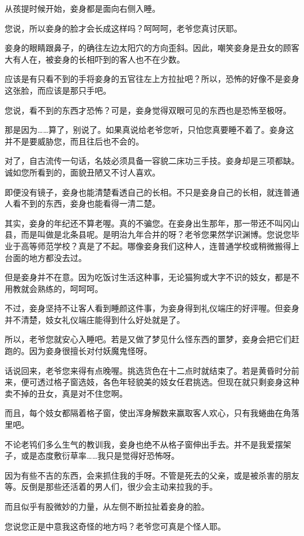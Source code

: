 \documentclass[portrait,a4paper]{article}
\begin{document}
从孩提时候开始，妾身都是面向右侧入睡。

您说，所以妾身的脸才会长成这样吗？呵呵呵，老爷您真讨厌耶。

妾身的眼睛跟鼻子，的确往左边太阳穴的方向歪斜。因此，嘲笑妾身是丑女的顾客大有人在，被妾身的长相吓到的客人也不在少数。

应该是有只看不到的手将妾身的五官往左上方拉扯吧？所以，恐怖的好像不是妾身这张脸，而应该是那只手吧。

您说，看不到的东西才恐怖？可是，妾身觉得双眼可见的东西也是恐怖至极呀。

那是因为……算了，别说了。如果真说给老爷您听，只怕您真要睡不着了。妾身这并不是要威胁您，而且往后也不会的。

对了，自古流传一句话，名妓必须具备一容貌二床功三手技。妾身却是三项都缺。诚如您所看到的，面貌丑陋又不讨人喜欢。

即便没有镜子，妾身也能清楚看透自己的长相。不只是妾身自己的长相，就连普通人看不到的东西，妾身也能看得一清二楚。

其实，妾身的年纪还不算老喔。真的不骗您。在妾身出生那年，那一带还不叫冈山县，而是叫做是北条县呢。是明治九年合并的呀？老爷您果然学识渊博。您说您毕业于高等师范学校？真是了不起。哪像妾身我们这种人，连普通学校或稍微搬得上台面的地方都没去过。

但是妾身并不在意。因为吃饭讨生活这种事，无论猫狗或大字不识的妓女，都是不用教就会熟练的，呵呵呵。

不过，妾身坚持不让客人看到睡颜这件事，为妾身得到礼仪端庄的好评喔。但妾身并不清楚，妓女礼仪端庄能得到什么好处就是了。

所以，老爷您就安心入睡吧。若是又做了梦见什么怪东西的噩梦，妾身会把它们赶跑的。因为妾身很擅长对付妖魔鬼怪呀。

话说回来，老爷您来得有点晚喔。挑选货色在十二点时就结束了。若是黄昏时分前来，便可透过格子窗选妓，各色年轻貌美的妓女任君挑选。但现在就只剩妾身这种卖不掉的丑女，真是对不住您啊。

而且，每个妓女都隔着格子窗，使出浑身解数来赢取客人欢心，只有我蜷曲在角落里吧。

不论老鸨们多么生气的教训我，妾身也绝不从格子窗伸出手去。并不是我爱摆架子，或是态度敷衍草率……我只是觉得好恐怖呀。

因为有些不吉的东西，会来抓住我的手呀。不管是死去的父亲，或是被杀害的朋友等。反倒是那些还活着的男人们，很少会主动来拉我的手。

而且似乎有股微妙的力量，从左侧不断拉扯着妾身的脸。

您说您正是中意我这奇怪的地方吗？老爷您可真是个怪人耶。
\end{document}
